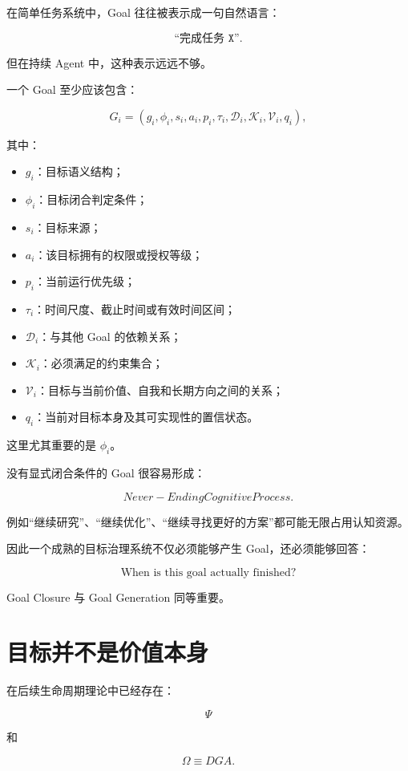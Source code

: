 在简单任务系统中，Goal 往往被表示成一句自然语言：

\[
\texttt{``完成任务 X''}.
\]

但在持续 Agent 中，这种表示远远不够。

一个 Goal 至少应该包含：

\[
\boxed{
G_i
=
\left(
g_i,
\phi_i,
s_i,
a_i,
p_i,
\tau_i,
\mathcal D_i,
\mathcal K_i,
\mathcal V_i,
q_i
\right),
}
\]

其中：

\begin{itemize}
    \item $g_i$：目标语义结构；
    \item $\phi_i$：目标闭合判定条件；
    \item $s_i$：目标来源；
    \item $a_i$：该目标拥有的权限或授权等级；
    \item $p_i$：当前运行优先级；
    \item $\tau_i$：时间尺度、截止时间或有效时间区间；
    \item $\mathcal D_i$：与其他 Goal 的依赖关系；
    \item $\mathcal K_i$：必须满足的约束集合；
    \item $\mathcal V_i$：目标与当前价值、自我和长期方向之间的关系；
    \item $q_i$：当前对目标本身及其可实现性的置信状态。
\end{itemize}

这里尤其重要的是 $\phi_i$。

没有显式闭合条件的 Goal 很容易形成：

\[
\boxed{
Never-Ending Cognitive Process.
}
\]

例如``继续研究''、``继续优化''、``继续寻找更好的方案''都可能无限占用认知资源。

因此一个成熟的目标治理系统不仅必须能够产生 Goal，还必须能够回答：

\[
\boxed{
\text{When is this goal actually finished?}
}
\]

Goal Closure 与 Goal Generation 同等重要。


\section{目标并不是价值本身}

在后续生命周期理论中已经存在：

\[
\Psi
\]

和

\[
\Omega\equiv DGA.
\]

